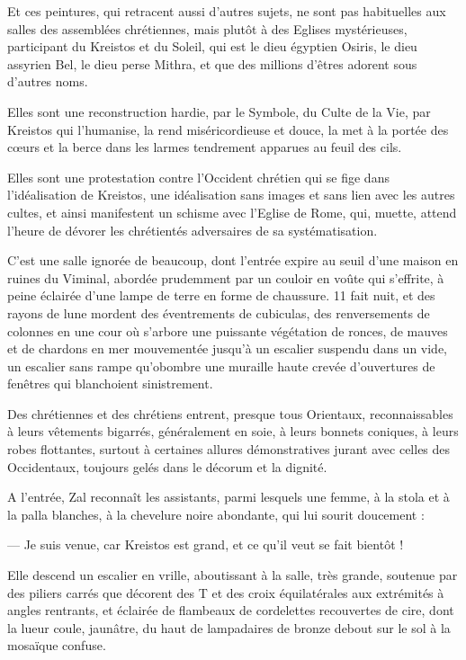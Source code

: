 \documentclass[a4paper, 11pt, oneside, polutonikogreek, french]{article}
\begin{document}
Et ces peintures, qui retracent aussi d'autres sujets, ne sont pas habituelles aux salles des assemblées chrétiennes, mais plutôt à des Eglises mystérieuses, participant du Kreistos et du Soleil, qui est le dieu égyptien Osiris, le dieu assyrien Bel, le dieu perse Mithra, et que des millions d'êtres adorent sous d'autres noms.

Elles sont une reconstruction hardie, par le Symbole, du Culte de la Vie, par Kreistos qui l'humanise, la rend miséricordieuse et douce, la met à la portée des cœurs et la berce dans les larmes tendrement apparues au feuil des cils.

Elles sont une protestation contre l'Occident chrétien qui se fige dans l'idéalisation de Kreistos, une idéalisation sans images et sans lien avec les autres cultes, et ainsi manifestent un schisme avec l'Eglise de Rome, qui, muette, attend l'heure de dévorer les chrétientés adversaires de sa systématisation.

C'est une salle ignorée de beaucoup, dont l'entrée expire au seuil d'une maison en ruines du Viminal, abordée prudemment par un couloir en voûte qui s'effrite, à peine éclairée d'une lampe de terre en forme de chaussure. 11 fait nuit, et des rayons de lune mordent des éventrements de cubiculas, des renversements de colonnes en une cour où s'arbore une puissante végétation de ronces, de mauves et de chardons en mer mouvementée jusqu'à un escalier suspendu dans un vide, un escalier sans rampe qu'obombre une muraille haute crevée d'ouvertures de fenêtres qui blanchoient sinistrement.

Des chrétiennes et des chrétiens entrent, presque tous Orientaux, reconnaissables à leurs vêtements bigarrés, généralement en soie, à leurs bonnets coniques, à leurs robes flottantes, surtout à certaines allures démonstratives jurant avec celles des Occidentaux, toujours gelés dans le décorum et la dignité.

A l'entrée, Zal reconnaît les assistants, parmi lesquels une femme, à la stola et à la palla blanches, à la chevelure noire abondante, qui lui sourit doucement :

--- Je suis venue, car Kreistos est grand, et ce qu'il veut se fait bientôt !

Elle descend un escalier en vrille, aboutissant à la salle, très grande, soutenue par des piliers carrés que décorent des T et des croix équilatérales aux extrémités à angles rentrants, et éclairée de flambeaux de cordelettes recouvertes de cire, dont la lueur coule, jaunâtre, du haut de lampadaires de bronze debout sur le sol à la mosaïque confuse.
\end{document}
